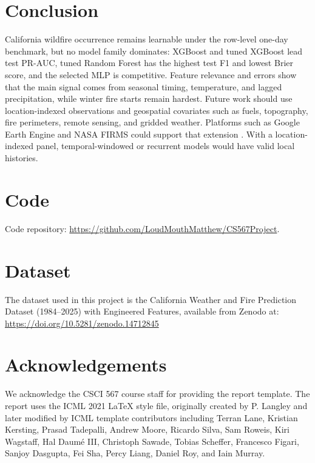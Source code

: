 \documentclass{article}
\begin{document}
\section{Conclusion}

California wildfire occurrence remains learnable under the row-level one-day benchmark, but no model family dominates: XGBoost and tuned XGBoost lead test PR-AUC, tuned Random Forest has the highest test F1 and lowest Brier score, and the selected MLP is competitive. Feature relevance and errors show that the main signal comes from seasonal timing, temperature, and lagged precipitation, while winter fire starts remain hardest. Future work should use location-indexed observations and geospatial covariates such as fuels, topography, fire perimeters, remote sensing, and gridded weather. Platforms such as Google Earth Engine and NASA FIRMS could support that extension \citep{gorelick2017gee,nasafirms}. With a location-indexed panel, temporal-windowed or recurrent models would have valid local histories.

\clearpage



\appendix

\section{Code}
\label{app:code}
Code repository: \url{https://github.com/LoudMouthMatthew/CS567Project}.

\section{Dataset}
\label{app:dataset}
The dataset used in this project is the California Weather and Fire Prediction Dataset (1984--2025) with Engineered Features, available from Zenodo at:\\
\url{https://doi.org/10.5281/zenodo.14712845}

\section{Acknowledgements}
\label{app:acknowledgements}
We acknowledge the CSCI 567 course staff for providing the report template. The report uses the ICML 2021 \LaTeX{} style file, originally created by P. Langley and later modified by ICML template contributors including Terran Lane, Kristian Kersting, Prasad Tadepalli, Andrew Moore, Ricardo Silva, Sam Roweis, Kiri Wagstaff, Hal Daum\'e III, Christoph Sawade, Tobias Scheffer, Francesco Figari, Sanjoy Dasgupta, Fei Sha, Percy Liang, Daniel Roy, and Iain Murray.
\end{document}

